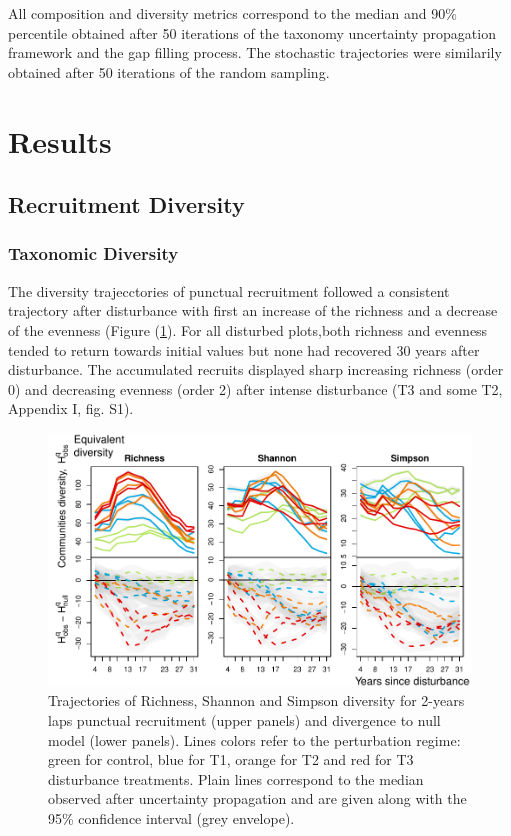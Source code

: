 \documentclass[fleqn,10pt]{ArtEcoFoG} %
\begin{document}
All composition and diversity metrics correspond to the median and 90\%
percentile obtained after 50 iterations of the taxonomy uncertainty
propagation framework and the gap filling process. The stochastic
trajectories were similarily obtained after 50 iterations of the random
sampling.

\section{Results}\label{results}

\subsection{Recruitment Diversity}\label{recruitment-diversity}

\subsubsection{Taxonomic Diversity}\label{taxonomic-diversity}

The diversity trajecctories of punctual recruitment followed a
consistent trajectory after disturbance with first an increase of the
richness and a decrease of the evenness (Figure (\ref{fig:DivTraj}). For
all disturbed plots,both richness and evenness tended to return towards
initial values but none had recovered 30 years after disturbance. The
accumulated recruits displayed sharp increasing richness (order 0) and
decreasing evenness (order 2) after intense disturbance (T3 and some T2,
Appendix I, fig. S1).

\begin{figure}

{\centering \includegraphics[width=0.8\linewidth]{RecruitmentTrajectories_files/figure-latex/DivTraj-1} 

}

\caption{Trajectories of Richness, Shannon and Simpson diversity for 2-years laps punctual  recruitment (upper panels) and divergence to null model (lower panels). Lines colors refer to the perturbation regime: green for control, blue for T1, orange for T2 and red for T3 disturbance treatments. Plain lines correspond to the median observed after uncertainty propagation and are given along with the 95\% confidence interval (grey envelope).}\label{fig:DivTraj}
\end{figure}
\end{document}
